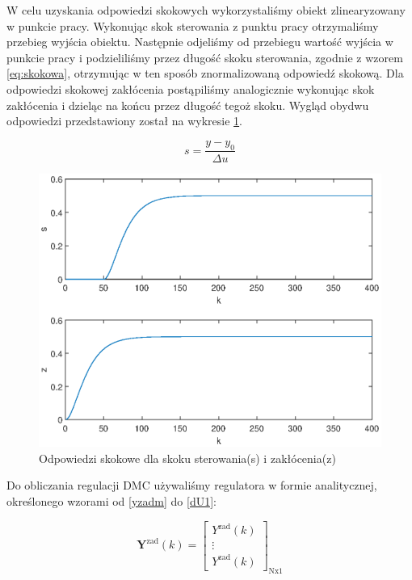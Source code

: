 		W celu uzyskania odpowiedzi skokowych wykorzystaliśmy obiekt zlinearyzowany w punkcie pracy. Wykonując skok sterowania z punktu pracy otrzymaliśmy przebieg wyjścia obiektu. Następnie odjeliśmy od przebiegu wartość wyjścia w punkcie pracy i podzieliliśmy przez długość skoku sterowania, zgodnie z wzorem \ref{eq:skokowa}, otrzymując w ten sposób znormalizowaną odpowiedź skokową. Dla odpowiedzi skokowej zakłócenia postąpiliśmy analogicznie wykonując skok zakłócenia i dzieląc na końcu przez długość tegoż skoku. Wygląd obydwu odpowiedzi przedstawiony został na wykresie \ref{rys:skok}.
		
		\begin{equation}
			s = \frac{y-y_0}{\Delta u}
			\label{eq:skokowa}
		\end{equation}
		
		\begin{figure}[h!]
			\includegraphics[width=0.9\linewidth]{plots/z1_step.eps}
			\caption{Odpowiedzi skokowe dla skoku sterowania(s) i zakłócenia(z)}
			\label{rys:skok}
		\end{figure}
	
		Do obliczania regulacji DMC używaliśmy regulatora w formie analitycznej, określonego wzorami od \ref{yzadm} do \ref{dU1}:
		
		\begin{equation}
		\boldsymbol{Y}^{\mathrm{zad}}(k)=\left[
		\begin{array}{c}
		Y^{\mathrm{zad}}(k)\\
		\vdots\\
		Y^{\mathrm{zad}}(k)
		\end{array}
		\right]_{\mathrm{Nx1}}
		\label{yzadm}
		\end{equation}
		
